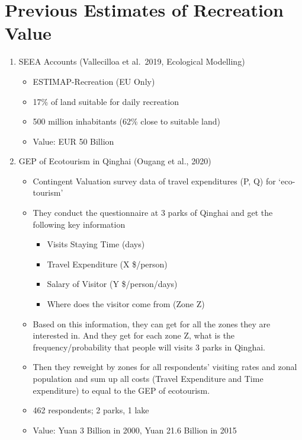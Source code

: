 \documentclass[
  letterpaper,
  DIV=11,
  numbers=noendperiod]{scrartcl}
\providecommand{\tightlist}{%
  \setlength{\itemsep}{0pt}\setlength{\parskip}{0pt}}\usepackage{longtable,booktabs,array}
\begin{document}
\hypertarget{previous-estimates-of-recreation-value}{%
\section{Previous Estimates of Recreation
Value}\label{previous-estimates-of-recreation-value}}

\begin{enumerate}
\def\labelenumi{\arabic{enumi}.}
\tightlist
\item
  SEEA Accounts (Vallecilloa et al.~2019, Ecological Modelling)

  \begin{itemize}
  \tightlist
  \item
    ESTIMAP-Recreation (EU Only)
  \item
    17\% of land suitable for daily recreation
  \item
    500 million inhabitants (62\% close to suitable land)
  \item
    Value: EUR 50 Billion
  \end{itemize}
\item
  GEP of Ecotourism in Qinghai (Ougang et al., 2020)

  \begin{itemize}
  \tightlist
  \item
    Contingent Valuation survey data of travel expenditures (P, Q) for
    `eco-tourism'
  \item
    They conduct the questionnaire at 3 parks of Qinghai and get the
    following key information

    \begin{itemize}
    \tightlist
    \item
      Visits Staying Time (days)
    \item
      Travel Expenditure (X \$/person)
    \item
      Salary of Visitor (Y \$/person/days)
    \item
      Where does the visitor come from (Zone Z)
    \end{itemize}
  \item
    Based on this information, they can get for all the zones they are
    interested in. And they get for each zone Z, what is the
    frequency/probability that people will visits 3 parks in Qinghai.
  \item
    Then they reweight by zones for all respondents' visiting rates and
    zonal population and sum up all costs (Travel Expenditure and Time
    expenditure) to equal to the GEP of ecotourism.
  \item
    462 respondents; 2 parks, 1 lake
  \item
    Value: Yuan 3 Billion in 2000, Yuan 21.6 Billion in 2015
  \end{itemize}
\end{enumerate}
\end{document}
